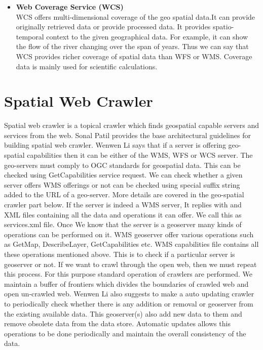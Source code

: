 \begin{itemize}
\item \textbf{Web Coverage Service (WCS)}\\
WCS offers multi-dimensional coverage of the geo spatial data.It can provide originally retrieved data or provide processed data. It provides spatio-temporal
context to the given geographical data. For example, it can show the flow of the river changing
over the span of years. Thus we can say that WCS provides richer coverage of spatial data than
WFS or WMS. Coverage data is mainly used for scientific calculations.
\end{itemize}
\section{Spatial Web Crawler}
Spatial web crawler is a topical crawler which finds geospatial capable servers and services from the web. Sonal Patil\cite{l1} provides the base architectural guidelines for building spatial web crawler. Wenwen Li\cite{l2} says that if a server is offering geo-spatial capabilities then it can be either of the WMS, WFS or WCS server. The geo-servers must comply to OGC standards for geospatial data. This can be checked using GetCapabilities service request. We can check whether a given server offers WMS offerings or not can be checked using special suffix string added to the URL of a geo-server. More details are covered in the geo-spatial crawler part below. If the server is indeed a WMS server, It replies with and XML files containing all the data and operations it can offer. We call this as services.xml file. Once We know that the server is a geoserver many kinds of operations can be performed on it. WMS geoserver offer various operations such as GetMap, DescribeLayer, GetCapabilities etc. WMS capabilities file contains all these operations mentioned above. This is to check if a particular server is geoserver or not. If we want to crawl through the open web, then we must repeat this process. For this purpose standard operation of crawlers are performed. We maintain a buffer of frontiers which divides the boundaries of crawled web and open un-crawled web. Wenwen Li\cite{l2} also suggests to make a auto updating crawler to periodically check whether there is any addition or removal or geoserver from the existing available data. This geoserver(s) also add new data to them and remove obsolete data from the data store. Automatic updates allows this operations to be done periodically and maintain the overall consistency of the data.\\
\par
